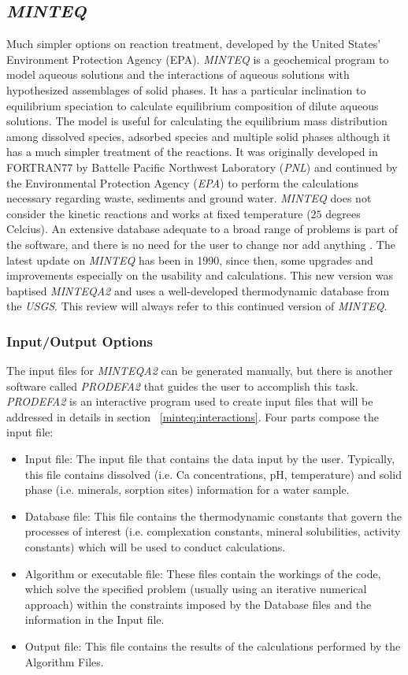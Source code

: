 \documentclass[ppgc,mestrado,english]{iiufrgs}
\begin{document}
\subsection{\emph{MINTEQ}}
Much simpler options on reaction treatment, developed by the United States' Environment Protection Agency (EPA).  \emph{MINTEQ} is a geochemical program to model aqueous solutions and the interactions of aqueous solutions with hypothesized assemblages of solid phases. It has a particular inclination to equilibrium speciation to calculate equilibrium composition of dilute aqueous solutions. The model is useful for calculating the equilibrium mass distribution among dissolved species, adsorbed species and multiple solid phases although it has a much simpler treatment of the reactions. It was originally developed in FORTRAN77 by Battelle Pacific Northwest Laboratory (\emph{PNL}) and continued by the Environmental Protection Agency (\emph{EPA}) to perform the calculations necessary regarding waste, sediments and ground water. \emph{MINTEQ} does not consider the kinetic reactions and works at fixed temperature ($25$ degrees Celcius). An extensive database adequate to a broad range of problems is part of the software, and there is no need for the user to change nor add anything \cite{Brown:87} \cite{Allison:91}. The latest update on \emph{MINTEQ} has been in 1990, since then, some upgrades and improvements especially on the usability and calculations. This new version was baptised \emph{MINTEQA2} and uses a well-developed thermodynamic database from the \emph{USGS}. This review will always refer to this continued version of \emph{MINTEQ}.

\subsubsection{Input/Output Options}
The input files for \emph{MINTEQA2} can be generated manually, but there is another software called \emph{PRODEFA2} that guides the user to accomplish this task. \emph{PRODEFA2} is an interactive program used to create input files that will be addressed in details in section ~\ref{minteq:interactions}. Four parts compose the input file:
\begin{itemize}
\item Input file: The input file that contains the data input by the user. Typically, this file contains dissolved (i.e. Ca concentrations, pH, temperature) and solid phase (i.e. minerals, sorption sites) information for a water sample.
\item Database file: This file contains the thermodynamic constants that govern the processes of interest (i.e. complexation constants, mineral solubilities, activity constants) which will be used to conduct calculations.
\item Algorithm or executable file:  These files contain the workings of the code, which solve the specified problem (usually using an iterative numerical approach) within the constraints imposed by the Database files and the information in the Input file.
\item Output file: This file contains the results of the calculations performed by the Algorithm Files.
\end{itemize}
\end{document}
